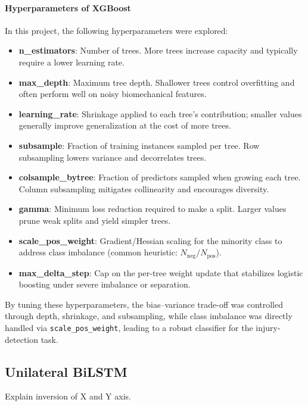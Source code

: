 \paragraph{Hyperparameters of XGBoost}
In this project, the following hyperparameters were explored:
\begin{itemize}
    \item \textbf{n\_estimators}: Number of trees. More trees increase capacity and typically require a lower learning rate.
    \item \textbf{max\_depth}: Maximum tree depth. Shallower trees control overfitting and often perform well on noisy biomechanical features.
    \item \textbf{learning\_rate}: Shrinkage applied to each tree's contribution; smaller values generally improve generalization at the cost of more trees.
    \item \textbf{subsample}: Fraction of training instances sampled per tree. Row subsampling lowers variance and decorrelates trees.
    \item \textbf{colsample\_bytree}: Fraction of predictors sampled when growing each tree. Column subsampling mitigates collinearity and encourages diversity.
    \item \textbf{gamma}: Minimum loss reduction required to make a split. Larger values prune weak splits and yield simpler trees.
    \item \textbf{scale\_pos\_weight}: Gradient/Hessian scaling for the minority class to address class imbalance (common heuristic: $N_{\text{neg}}/N_{\text{pos}}$).
    \item \textbf{max\_delta\_step}: Cap on the per-tree weight update that stabilizes logistic boosting under severe imbalance or separation.
\end{itemize}
By tuning these hyperparameters, the bias--variance trade-off was controlled through depth, shrinkage, and subsampling, while class imbalance was directly handled via \texttt{scale\_pos\_weight}, leading to a robust classifier for the injury-detection task.

\subsection{Unilateral BiLSTM}\label{subsec:method-unilat-bilstm}
Explain inversion of X and Y axis.




